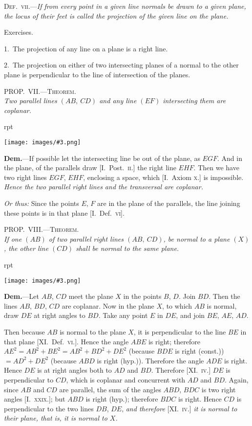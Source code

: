 \documentclass[oneside]{book}
\newcounter{wrapwidth}
\newcommand\myprop[2]{
\bigskip\Needspace*{4\baselineskip}\begin{center}\textsc{#1}\\\medskip\emph{#2}\par\end{center}
}
\newcommand\exhead[1]{
\Needspace*{5\baselineskip}\begin{center}
\textsf{#1}
\end{center}
}
\newcommand\imgflow[3]{
\setcounter{wrapwidth}{#1}
\begin{wrapfigure}[#2]{r}{\value{wrapwidth}pt}
\begin{center}
\vspace{-0.3in}
\texttt{[image: images/\#3.png]}
\end{center}
\end{wrapfigure}
}
\begin{document}
\smallskip
\textsc{Def.~vii.}---\textit{If from every point in a given line normals
be drawn to a given plane, the locus of their feet is called
the projection of the given line on the plane.}

\exhead{Exercises.}

\begin{footnotesize}
1.~The projection of any line on a plane is a right line.

2.~The projection on either of two intersecting planes of a
normal to the other plane is perpendicular to the line of intersection
of the planes.
\par\end{footnotesize}

\myprop{PROP\@.~VII\@.---Theorem.}{Two parallel lines $(AB,\ CD)$ and any line $(EF)$ intersecting
them are coplanar.}

\imgflow{150}{6}{f221}

\textbf{Dem.}---If possible let the intersecting line be out of
the plane, as $EGF$. And in
the plane, of the parallels
draw [I.~Post.~\textsc{ii}.] the
right line $EHF$.  Then
we have two right lines
$EGF$, $EHF$, enclosing a
space, which [I.~Axiom \textsc{x.}] is impossible. \textit{Hence the
two parallel right lines and the transversal are coplanar.}

\smallskip
\begin{footnotesize}
\emph{Or thus:} Since the points $E$, $F$ are in the plane of the parallels,
the line joining these points is in that plane [I.~Def.~\textsc{vi}].
\par\end{footnotesize}

\myprop{PROP\@.~VIII\@.---Theorem.}{If one $(AB)$ of two parallel right lines $(AB,\ CD)$, be
normal to a plane $(X)$, the other line $(CD)$ shall be normal
to the same plane.}

\imgflow{100}{11}{f222}

\textbf{Dem.}---Let $AB$, $CD$ meet the plane $X$ in the points
$B$, $D$. Join $BD$. Then the lines $AB$, $BD$, $CD$ are coplanar.
Now in the plane $X$, to
which $AB$ is normal, draw $DE$ at
right angles to $BD$. Take any
point $E$ in $DE$, and join $BE$, $AE$,
$AD$.

Then because $AB$ is normal to
the plane $X$, it is perpendicular to
the line $BE$ in that plane [XI\@.\ Def.~\textsc{vi.}].
Hence the angle $ABE$
is right; therefore $AE^{2} = AB^{2} + BE^{2}
= AB^{2} + BD^{2} + DE^{2}$ (because $BDE$
is right (const.)) $= AD^{2} + DE^{2}$ (because $ABD$ is right
(hyp.)). Therefore the angle $ADE$ is right. Hence
$DE$ is at right angles both to $AD$ and $BD$. Therefore
[XI\@.~\textsc{iv.}] $DE$ is perpendicular to $CD$, which is coplanar
and concurrent with $AD$ and $BD$. Again, since $AB$
and $CD$ are parallel, the sum of the angles $ABD$, $BDC$
is two right angles [I.~\textsc{xxix.}]; but $ABD$ is right (hyp.);
therefore $BDC$ is right. Hence $CD$ is perpendicular to
the two lines $DB$, $DE$, \textit{and therefore} [XI\@.~\textsc{iv.}] \textit{it is normal
to their plane, that is, it is normal to $X$.}
\end{document}
